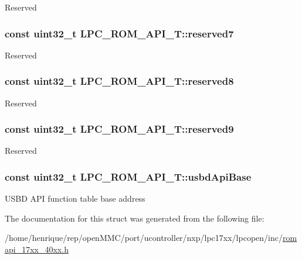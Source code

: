 Reserved \hypertarget{structLPC__ROM__API__T_a7a9d7f0aa59c70ff085c59291594d22c}{
\subsubsection[{reserved7}]{\setlength{\rightskip}{0pt plus 5cm}const uint32\-\_\-t L\-P\-C\-\_\-\-R\-O\-M\-\_\-\-A\-P\-I\-\_\-\-T\-::reserved7}}\label{structLPC__ROM__API__T_a7a9d7f0aa59c70ff085c59291594d22c}
Reserved \hypertarget{structLPC__ROM__API__T_a81674fc569de19c3dd861c1f87df1d44}{
\subsubsection[{reserved8}]{\setlength{\rightskip}{0pt plus 5cm}const uint32\-\_\-t L\-P\-C\-\_\-\-R\-O\-M\-\_\-\-A\-P\-I\-\_\-\-T\-::reserved8}}\label{structLPC__ROM__API__T_a81674fc569de19c3dd861c1f87df1d44}
Reserved \hypertarget{structLPC__ROM__API__T_aae524e6f969485072d45b577c7501abc}{
\subsubsection[{reserved9}]{\setlength{\rightskip}{0pt plus 5cm}const uint32\-\_\-t L\-P\-C\-\_\-\-R\-O\-M\-\_\-\-A\-P\-I\-\_\-\-T\-::reserved9}}\label{structLPC__ROM__API__T_aae524e6f969485072d45b577c7501abc}
Reserved \hypertarget{structLPC__ROM__API__T_a94bc8146ba697eeadc992d4985971550}{
\subsubsection[{usbd\-Api\-Base}]{\setlength{\rightskip}{0pt plus 5cm}const uint32\-\_\-t L\-P\-C\-\_\-\-R\-O\-M\-\_\-\-A\-P\-I\-\_\-\-T\-::usbd\-Api\-Base}}\label{structLPC__ROM__API__T_a94bc8146ba697eeadc992d4985971550}
U\-S\-B\-D A\-P\-I function table base address 

The documentation for this struct was generated from the following file\-:\begin{DoxyCompactItemize}
\item 
/home/henrique/rep/open\-M\-M\-C/port/ucontroller/nxp/lpc17xx/lpcopen/inc/\hyperlink{romapi__17xx__40xx_8h}{romapi\-\_\-17xx\-\_\-40xx.\-h}\end{DoxyCompactItemize}
